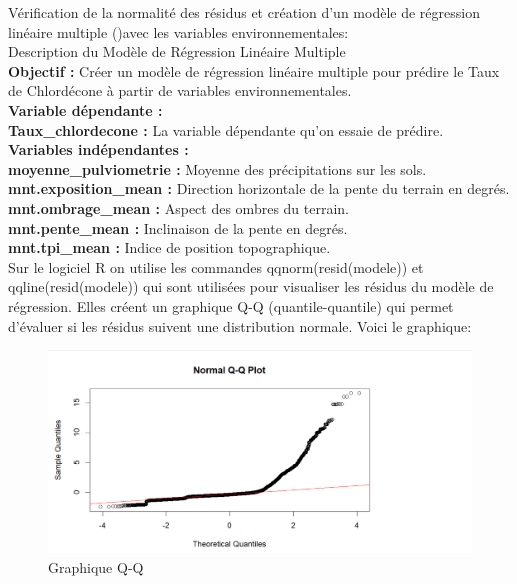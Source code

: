 \documentclass{report}
\begin{document}
Vérification de la normalité des résidus et  création d'un modèle de régression linéaire multiple (\cite{statistic1})avec les variables environnementales:\\  
Description du Modèle de Régression Linéaire Multiple\\
\large\textbf{Objectif :} Créer un modèle de régression linéaire multiple pour prédire le Taux de Chlordécone à partir de variables environnementales.\\
\Large\textbf{Variable dépendante :}\\
\large\textbf{Taux\_chlordecone :} La variable dépendante qu'on essaie de prédire.\\
\large\textbf{Variables indépendantes :}\\
\large\textbf{moyenne\_pulviometrie :} Moyenne des précipitations sur les sols.\\
\large\textbf{mnt.exposition\_mean :} Direction horizontale de la pente du terrain en degrés.\\
\large\textbf{mnt.ombrage\_mean :} Aspect des ombres du terrain.\\
\large\textbf{mnt.pente\_mean :} Inclinaison de la pente en degrés.\\
\large\textbf{mnt.tpi\_mean :} Indice de position topographique.\\

Sur le logiciel R on utilise les commandes qqnorm(resid(modele)) et qqline(resid(modele)) qui sont utilisées pour visualiser les résidus du modèle de régression. Elles créent un graphique Q-Q (quantile-quantile) \cite{millot2018comprendre} qui permet d'évaluer si les résidus suivent une distribution normale. Voici le graphique:

\begin{figure}[H]
\centering
\includegraphics[width = 1
\linewidth]{graphiqueQQ.png}
\caption{Graphique Q-Q}
\end{figure}
\end{document}
